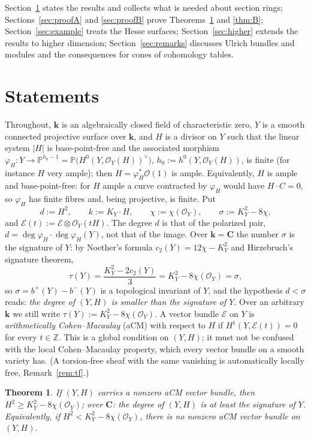 \documentclass[11pt]{amsart}
\newtheorem{theorem}{Theorem}[section]
\theoremstyle{remark}
\theoremstyle{definition}
\newcommand{\PP}{\mathbb{P}}
\newcommand{\ZZ}{\mathbb{Z}}
\newcommand{\CC}{\mathbf{C}}
\newcommand{\bk}{\mathbf{k}}
\newcommand{\cO}{\mathcal{O}}
\newcommand{\cE}{\mathcal{E}}
\begin{document}
Section~\ref{sec:statements} states the results and collects what is needed about section rings; Sections~\ref{sec:proofA} and \ref{sec:proofB} prove Theorems~\ref{thm:A} and \ref{thm:B}; Section~\ref{sec:example} treats the Hesse surfaces; Section~\ref{sec:higher} extends the results to higher dimension; Section~\ref{sec:remarks} discusses Ulrich bundles and modules and the consequences for cones of cohomology tables.

\section{Statements}\label{sec:statements}

Throughout, $\bk$ is an algebraically closed field of characteristic zero, $Y$ is a smooth connected projective surface over $\bk$, and $H$ is a divisor on $Y$ such that the linear system $|H|$ is base-point-free and the associated morphism $\varphi_H\colon Y\to\PP^{h_0-1}=\PP\bigl(H^0(Y,\cO_Y(H))^\vee\bigr)$, $h_0:=h^0(Y,\cO_Y(H))$, is finite (for instance $H$ very ample); then $H=\varphi_H^*\cO(1)$ is ample. Equivalently, $H$ is ample and base-point-free: for $H$ ample a curve contracted by $\varphi_H$ would have $H\cdot C=0$, so $\varphi_H$ has finite fibres and, being projective, is finite. Put
\[
d:=H^2,\qquad k:=K_Y\cdot H,\qquad \chi:=\chi(\cO_Y),\qquad \sigma:=K_Y^2-8\chi ,
\]
and $\cE(t):=\cE\otimes\cO_Y(tH)$. The degree $d$ is that of the polarized pair, $d=\deg\varphi_H\cdot\deg\varphi_H(Y)$, not that of the image. Over $\bk=\CC$ the number $\sigma$ is the signature of $Y$: by Noether's formula $c_2(Y)=12\chi-K_Y^2$ and Hirzebruch's signature theorem,
\[
\tau(Y)=\frac{K_Y^2-2c_2(Y)}{3}=K_Y^2-8\chi(\cO_Y)=\sigma ,
\]
so $\sigma=b^+(Y)-b^-(Y)$ is a topological invariant of $Y$, and the hypothesis $d<\sigma$ reads: \emph{the degree of $(Y,H)$ is smaller than the signature of $Y$}. Over an arbitrary $\bk$ we still write $\tau(Y):=K_Y^2-8\chi(\cO_Y)$. A vector bundle $\cE$ on $Y$ is \emph{arithmetically Cohen--Macaulay} (aCM) with respect to $H$ if $H^1(Y,\cE(t))=0$ for every $t\in\ZZ$. This is a global condition on $(Y,H)$; it must not be confused with the local Cohen--Macaulay property, which every vector bundle on a smooth variety has. (A torsion-free sheaf with the same vanishing is automatically locally free, Remark~\ref{rem:tf}.)


\begin{theorem}\label{thm:A}
If $(Y,H)$ carries a nonzero aCM vector bundle, then $H^2\ge K_Y^2-8\chi(\cO_Y)$; over $\CC$: the degree of $(Y,H)$ is at least the signature of $Y$. Equivalently, if $H^2<K_Y^2-8\chi(\cO_Y)$, there is no nonzero aCM vector bundle on $(Y,H)$.
\end{theorem}
\end{document}

